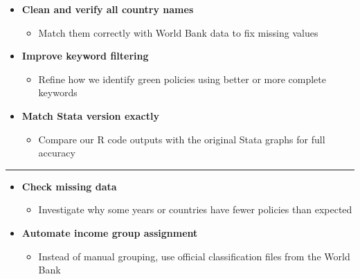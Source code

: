 \documentclass[
  letterpaper,
  DIV=11,
  numbers=noendperiod]{scrartcl}
\providecommand{\tightlist}{%
  \setlength{\itemsep}{0pt}\setlength{\parskip}{0pt}}
\begin{document}
\begin{itemize}
\tightlist
\item
  \textbf{Clean and verify all country names}

  \begin{itemize}
  \tightlist
  \item
    Match them correctly with World Bank data to fix missing values
  \end{itemize}
\item
  \textbf{Improve keyword filtering}

  \begin{itemize}
  \tightlist
  \item
    Refine how we identify green policies using better or more complete
    keywords
  \end{itemize}
\item
  \textbf{Match Stata version exactly}

  \begin{itemize}
  \tightlist
  \item
    Compare our R code outputs with the original Stata graphs for full
    accuracy
  \end{itemize}
\end{itemize}

\begin{center}\rule{0.5\linewidth}{0.5pt}\end{center}

\begin{itemize}
\tightlist
\item
  \textbf{Check missing data}

  \begin{itemize}
  \tightlist
  \item
    Investigate why some years or countries have fewer policies than
    expected
  \end{itemize}
\item
  \textbf{Automate income group assignment}

  \begin{itemize}
  \tightlist
  \item
    Instead of manual grouping, use official classification files from
    the World Bank
  \end{itemize}
\end{itemize}
\end{document}
